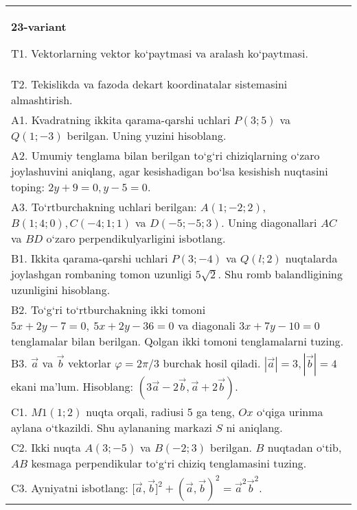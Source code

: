 \documentclass{article}
\begin{document}
\begin{tabular}{m{17cm}}
\textbf{23-variant}
\newline

T1. 
Vektorlarning vektor ko‘paytmasi va aralash ko‘paytmasi.
 \\
T2. Tekislikda va fazoda dekart koordinatalar sistemasini almashtirish.
 \\
A1. 
Kvadratning ikkita qarama-qarshi uchlari $P (3; 5) $ va
$Q (1; -3) $ berilgan. Uning yuzini hisoblang.
 \\
A2. 
Umumiy tenglama bilan berilgan to‘g‘ri chiziqlarning
o‘zaro joylashuvini aniqlang, agar kesishadigan bo‘lsa kesishish nuqtasini
toping: $2y+9=0, y-5=0$.
 \\
A3. 
To‘rtburchakning uchlari berilgan:
$A (1; - 2;2) $, $B (1;4;0),C (- 4;1;1) $ va $D (- 5; -5;3) $. Uning diagonallari $AC$ va $BD$ o‘zaro
perpendikulyarligini isbotlang.
 \\
B1. 
Ikkita qarama-qarshi uchlari $P (3; -4) $ va $Q (l;2) $ nuqtalarda joylashgan rombaning tomon uzunligi \(5\sqrt{2}\). Shu romb balandligining uzunligini hisoblang.
 \\
B2. 
To‘g‘ri to‘rtburchakning ikki tomoni
\(5x+2y-7=0,\ 5x+2y-36=0\) va diagonali
\(3x+7y-10=0\) tenglamalar bilan berilgan. Qolgan ikki tomoni
tenglamalarni tuzing.
 \\
B3. 
$\vec{a}$ va $\vec{b}$ vektorlar $\varphi = 2\pi/3$ burchak hosil qiladi. $|\vec{a}| = 3,|\vec{b}| = 4$ ekani ma’lum. Hisoblang:
$\left(3\vec{a} - 2\vec{b},\vec{a} + 2\vec{b} \right) $.
 \\
C1. 
\(M{1} (1; 2) \) nuqta orqali, radiusi 5 ga teng,
$Ox$ o‘qiga urinma aylana o‘tkazildi. Shu aylananing markazi
$S$ ni aniqlang.
 \\
C2. 
Ikki nuqta \(A (3; - 5) \) va \(B (- 2;3) \) berilgan.
$B$ nuqtadan o‘tib, $AB$ kesmaga perpendikular to‘g‘ri chiziq
tenglamasini tuzing.
 \\
C3. 
Ayniyatni isbotlang: \(\lbrack\vec{a},\vec{b}\rbrack^{2} + (\vec{a},\vec{b}) ^{2} = {\vec{a}}^{2}{\vec{b}}^{2}\).
 \\

\end{tabular}
\vspace{1cm}
\end{document}
